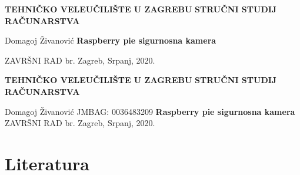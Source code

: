 \documentclass[12pt,a4paper]{article}
\date{}
\newcommand{\collegeName}{TEHNIČKO VELEUČILIŠTE U ZAGREBU}
\newcommand{\smjer}{STRUČNI STUDIJ RAČUNARSTVA}
\newcommand{\radTittle}{Raspberry pie sigurnosna kamera}
\newcommand{\radNumber}{}
\begin{document}
\begin{center} \obeylines
  {\large \textbf{\collegeName}}
  {\normalsize \textbf{\smjer}}
\end{center}
\begin{center} \obeylines
  \vspace{\fill}
    Domagoj Živanović 
    {\Large \textbf{\radTittle}}
    \item ZAVRŠNI RAD br. \radNumber
  \vspace*{\fill}
  Zagreb, Srpanj, 2020.
\end{center}

\thispagestyle{empty}

\clearpage

\begin{center} \obeylines
  {\large \textbf{\collegeName}}
  {\normalsize \textbf{\smjer}}
\end{center}
\begin{center} \obeylines
  \vspace{\fill}
      Domagoj Živanović
      JMBAG: 0036483209
    {\Large \textbf{\radTittle}}
    ZAVRŠNI RAD br. \radNumber
  \vspace*{\fill}
  Zagreb, Srpanj, 2020.
\end{center}

\thispagestyle{empty}

\clearpage

\tableofcontents
\clearpage

\listoftables
\listoffigures




% 




\section{Literatura}
\printbibliography[heading=none]
\end{document}
